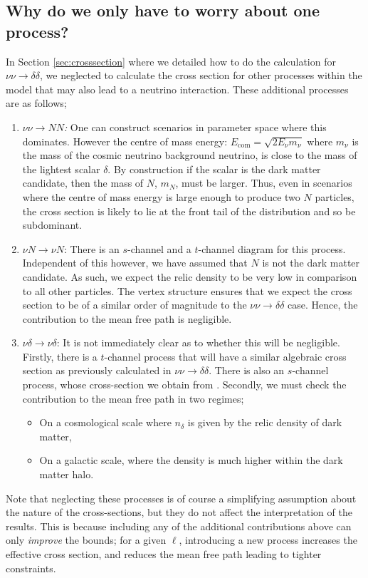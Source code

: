 \subsection{Why do we only have to worry about one process?}\label{sec:oneprocess}



In Section \ref{sec:crosssection} where we detailed how to do the calculation for $\nu\nu \rightarrow \delta\delta$, we neglected to calculate the cross section for other processes within the model that may also lead to a neutrino interaction. These additional processes are as follows;
\begin{enumerate}
  \item \textit{$\nu\nu \rightarrow NN$:} One can construct scenarios in parameter space where this dominates. However the centre of mass energy: $E_{\mathrm{com}} = \sqrt{2 E_\nu m_\nu}$ where $m_\nu$ is the mass of the cosmic neutrino background neutrino, is close to the mass of the lightest scalar $\delta$. By construction if the scalar is the dark matter candidate, then the mass of $N$, $m_N$, must be larger. Thus, even in scenarios where the centre of mass energy is large enough to produce two $N$ particles, the cross section is likely to lie at the front tail of the distribution and so be subdominant.
  \item $\nu N \rightarrow \nu N$: There is an $s$-channel and a $t$-channel diagram for this process. Independent of this however, we have assumed that $N$ is not the dark matter candidate. As such, we expect the relic density to be very low in comparison to all other particles. The vertex structure ensures that we expect the cross section to be of a similar order of magnitude to the $\nu\nu \rightarrow \delta\delta$ case. Hence, the contribution to the mean free path is negligible.
  \item $\nu\delta \rightarrow \nu\delta$: It is not immediately clear as to whether this will be negligible. Firstly, there is a $t$-channel process that will have a similar algebraic cross section as previously calculated in $\nu\nu \rightarrow \delta\delta$. There is also an $s$-channel process, whose cross-section we obtain from \cite{Franarin2018}. Secondly, we must check the contribution to the mean free path in two regimes;
  \begin{itemize}
    \item On a cosmological scale where $n_\delta$ is given by the relic density of dark matter,
    \item On a galactic scale, where the density is much higher within the dark matter halo.
  \end{itemize}
\end{enumerate}
Note that neglecting these processes is of course a simplifying assumption about the nature of the cross-sections, but they do not affect the interpretation of the results. This is because including any of the additional contributions above can only \textit{improve} the bounds; for a given $\ell$, introducing a new process increases the effective cross section, and reduces the mean free path leading to tighter constraints.

